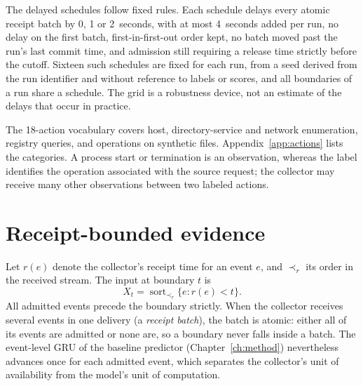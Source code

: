The delayed schedules follow fixed rules. Each schedule delays every atomic receipt batch by 0, 1 or
2~seconds, with at most 4~seconds added per run, no delay on the first
batch, first-in-first-out order kept, no batch moved past the run's last
commit time, and admission still requiring a release time strictly
before the cutoff. Sixteen such schedules are fixed for each run, from a
seed derived from the run identifier and without reference to labels or
scores, and all boundaries of a run share a schedule. The grid is a
robustness device, not an estimate of the delays that occur in
practice.

The 18-action vocabulary covers host, directory-service and network
enumeration, registry queries, and operations on synthetic files.
Appendix~\ref{app:actions} lists the categories. A process start or
termination is an observation, whereas the label identifies the
operation associated with the source request; the collector may
receive many other observations between two labeled actions.

\section{Receipt-bounded evidence}
\label{sec:receipt}

Let $r(e)$ denote the collector's receipt time for an event $e$,
and $\prec_r$ its order in the received stream. The input at boundary
$t$ is
\begin{equation}
  X_t = \operatorname{sort}_{\prec_r}\bigl\{e : r(e) < t\bigr\}.
  \label{eq:receipt}
\end{equation}
All admitted events precede the boundary strictly. When the collector
receives several events in one delivery (a \emph{receipt batch}), the
batch is atomic: either all of its events are admitted or none are, so
a boundary never falls inside a batch. The event-level GRU of the
baseline predictor (Chapter~\ref{ch:method}) nevertheless advances once
for each admitted event, which separates the collector's unit of
availability from the model's unit of computation.

